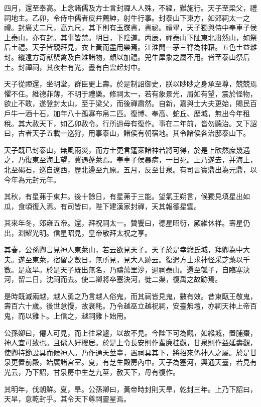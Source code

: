 四月，還至奉高。上念諸儒及方士言封禪人人殊，不經，難施行。天子至梁父，禮祠地主。乙卯，令侍中儒者皮弁薦紳，射牛行事。封泰山下東方，如郊祠太一之禮。封廣丈二尺，高九尺，其下則有玉牒書，書祕。禮畢，天子獨與侍中奉車子侯上泰山，亦有封。其事皆禁。明日，下陰道。丙辰，禪泰山下阯東北肅然山，如祭后土禮。天子皆親拜見，衣上黃而盡用樂焉。江淮閒一茅三脊為神藉。五色土益雜封。縱遠方奇獸蜚禽及白雉諸物，頗以加禮。兕牛犀象之屬不用。皆至泰山祭后土。封禪祠，其夜若有光，晝有白雲起封中。

天子從禪還，坐明堂，群臣更上壽。於是制詔御史，朕以眇眇之身承至尊，兢兢焉懼不任。維德菲薄，不明于禮樂。修祠太一，若有象景光，屑如有望，震於怪物，欲止不敢，遂登封太山，至于梁父，而後禪肅然。自新，嘉與士大夫更始，賜民百戶牛一酒十石，加年八十孤寡布帛二匹。復博、奉高、蛇丘、歷城，無出今年租稅。其大赦天下，如乙卯赦令。行所過毋有復作。事在二年前，皆勿聽治。又下詔曰，古者天子五載一巡狩，用事泰山，諸侯有朝宿地。其令諸侯各治邸泰山下。

天子既已封泰山，無風雨災，而方士更言蓬萊諸神若將可得，於是上欣然庶幾遇之，乃復東至海上望，冀遇蓬萊焉。奉車子侯暴病，一日死。上乃遂去，并海上，北至碣石，巡自遼西，歷北邊至九原。五月，反至甘泉。有司言寶鼎出為元鼎，以今年為元封元年。

其秋，有星茀于東井。後十餘日，有星茀于三能。望氣王朔言，候獨見填星出如瓜，食頃復入焉。有司皆曰，陛下建漢家封禪，天其報德星雲。

其來年冬，郊雍五帝。還，拜祝祠太一。贊饗曰，德星昭衍，厥維休祥。壽星仍出，淵耀光明。信星昭見，皇帝敬拜太祝之享。

其春，公孫卿言見神人東萊山，若云欲見天子。天子於是幸緱氏城，拜卿為中大夫。遂至東萊，宿留之數日，無所見，見大人跡云。復遣方士求神怪采芝藥以千數。是歲旱。於是天子既出無名，乃禱萬里沙，過祠泰山。還至瓠子，自臨塞決河，留二日，沈祠而去。使二卿將卒塞決河，徙二渠，復禹之故跡焉。

是時既滅兩越，越人勇之乃言越人俗鬼，而其祠皆見鬼，數有效。昔東甌王敬鬼，壽百六十歲。後世怠慢，故衰秏。乃令越巫立越祝祠，安臺無壇，亦祠天神上帝百鬼，而以雞卜。上信之，越祠雞卜始用。

公孫卿曰，僊人可見，而上往常遽，以故不見。今陛下可為觀，如緱城，置脯棗，神人宜可致也。且僊人好樓居。於是上令長安則作蜚廉桂觀，甘泉則作益延壽觀，使卿持節設具而候神人。乃作通天莖臺，置祠具其下，將招來僊神人之屬。於是甘泉更置前殿，始廣諸宮室。夏，有芝生殿房內中。天子為塞河，興通天臺，若見有光云，乃下詔，甘泉房中生芝九莖，赦天下，毋有復作。

其明年，伐朝鮮。夏，旱。公孫卿曰，黃帝時封則天旱，乾封三年。上乃下詔曰，天旱，意乾封乎。其令天下尊祠靈星焉。

